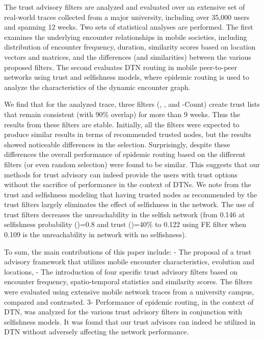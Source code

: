 \documentclass[10pt,conference]{IEEEtran}
\begin{document}
The trust advisory filters are analyzed and evaluated over an extensive set of real-world traces collected from a major university, including over 35,000 users and spanning 12 weeks. Two sets of statistical analyses are performed. The first examines the underlying encounter relationships in mobile societies, including distribution of encounter frequency, duration, similarity scores based on location vectors and matrices, and the differences (and similarities) between the various proposed filters. The second evaluates DTN routing in mobile peer-to-peer networks using trust and selfishness models, where epidemic routing is used to analyze the characteristics of the dynamic encounter graph.

We find that for the analyzed trace, three filters (, , and -Count) create trust lists that remain consistent (with 90\% overlap) for more than 9 weeks. Thus the results from these filters are stable.  Initially, all the filters were expected to produce similar results in terms of recommended trusted nodes, but the results showed noticeable differences in the selection. Surprisingly, despite these differences the overall performance of epidemic routing based on the different filters (or even random selection) were found to be similar. This suggests that our methods for trust advisory can indeed provide the users with trust options without the sacrifice of performance in the context of DTNs. We note from the trust and selfishness modeling that having trusted nodes as recommended by the trust filters largely eliminates the effect of selfishness in the network. The use of trust filters decreases the unreachability in the selfish network (from 0.146 at selfishness probability ()=0.8 and trust ()=40\% to 0.122 using FE filter when 0.109 is the unreachability in network with no selfishness).

To sum, the main contributions of this paper include: - The proposal of a trust advisory framework that utilizes mobile encounter characteristics, evolution and locations, - The introduction of four specific trust advisory filters based on encounter frequency, spatio-temporal statistics and similarity scores. The filters were evaluated using extensive mobile network traces from a university campus, compared and contrasted. 3- Performance of epidemic routing, in the context of DTN, was analyzed for the various trust advisory filters in conjunction with selfishness models. It was found that our trust advisors can indeed be utilized in DTN without adversely affecting the network performance.
\end{document}
